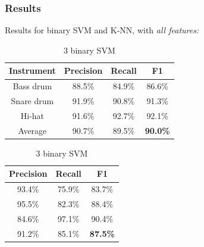 \documentclass{beamer}
\begin{document}
    \begin{frame}
        \frametitle{Results}
        Results for binary SVM and K-NN, with \emph{all features:}
                \begin{center}
        \footnotesize 
        \begin{table}
        \parbox{.50\linewidth}{       
        \caption{3 binary K-NN}
        \begin{tabular}{|c|c|c|c|}
        \hline
        Instrument&Precision&Recall&F1\\
        \hline
        Bass drum&88.5\%&84.9\%&86.6\%\\
        \hline
        Snare drum&91.9\%&90.8\%&91.3\%\\
        \hline
        Hi-hat&91.6\%&92.7\%&92.1\%\\
        \hline
        Average&90.7\%&89.5\%&\textbf{90.0\%}\\
        \hline
        \end{tabular}
        }
        \hfill
        \parbox{.40\linewidth}{
        \caption{3 binary SVM}
        \begin{tabular}{|c|c|c|}
        \hline
        Precision&Recall&F1\\
        \hline
        93.4\%&75.9\%&83.7\%\\
        \hline
        95.5\%&82.3\%&88.4\%\\
        \hline
        84.6\%&97.1\%&90.4\%\\
        \hline
        91.2\%&85.1\%&\textbf{87.5\%}\\
        \hline
        \end{tabular}
        }
        \end{table}  
        \end{center}
    \end{frame}
    
\end{document}
